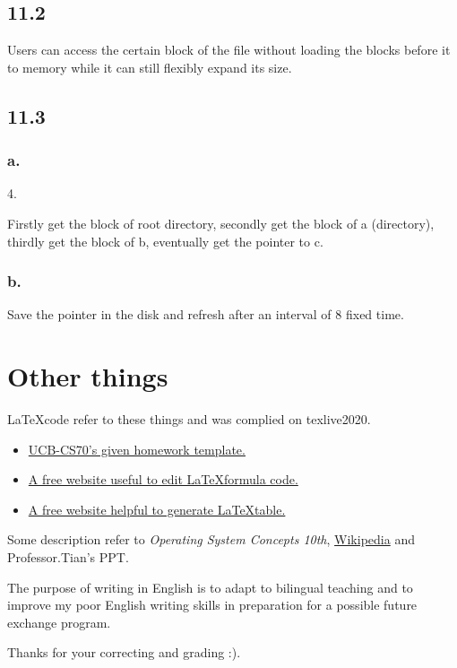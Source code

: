 \documentclass[11pt]{article}
\begin{document}
 
\subsection*{11.2}

Users can access the certain block of the file without loading the blocks before it to memory while it can still 
flexibly expand its size.

\subsection*{11.3}

\subsubsection*{a.}

4. 

Firstly get the block of root directory, secondly get the block of a (directory), thirdly get the block of b, 
eventually get the pointer to c.

\subsubsection*{b.}

Save the pointer in the disk and refresh after an interval of 8 fixed time.
 

\section*{Other things}

    \LaTeX \space code refer to these things and was complied on texlive2020.
    \begin{itemize}
        \item  \href{https://www.eecs70.org/assets/misc/homework_template.tex}{UCB-CS70's given homework template.} 
        \item  \href{https://www.latexlive.com}{A free website useful to edit \LaTeX \space formula code.}
        \item  \href{https://www.tablesgenerator.com/}{A free website helpful to generate \LaTeX \space table.}
    \end{itemize}

    Some description refer to \textit{Operating System Concepts 10th}, \href{https://en.wikipedia.org}{Wikipedia} 
    and Professor.Tian's PPT.

    The purpose of writing in English is to adapt to bilingual teaching and to improve my poor English 
    writing skills in preparation for a possible future exchange program. 

    Thanks for your correcting and grading :).
\end{document}
